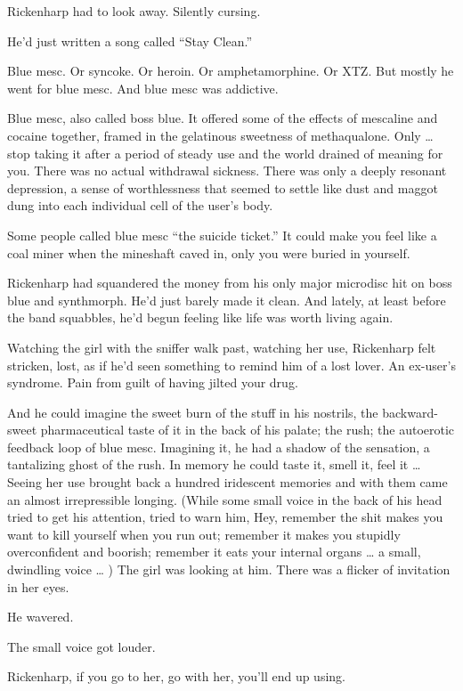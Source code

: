 Rickenharp had to look away. Silently cursing.

He’d just written a song called “Stay Clean.”

Blue mesc. Or syncoke. Or heroin. Or amphetamorphine. Or XTZ. But mostly he went for blue mesc. And blue mesc was addictive.

Blue mesc, also called boss blue. It offered some of the effects of mescaline and cocaine together, framed in the gelatinous sweetness of methaqualone. Only … stop taking it after a period of steady use and the world drained of meaning for you. There was no actual withdrawal sickness. There was only a deeply resonant depression, a sense of worthlessness that seemed to settle like dust and maggot dung into each individual cell of the user’s body.

Some people called blue mesc “the suicide ticket.” It could make you feel like a coal miner when the mineshaft caved in, only you were buried in yourself.

Rickenharp had squandered the money from his only major microdisc hit on boss blue and synthmorph. He’d just barely made it clean. And lately, at least before the band squabbles, he’d begun feeling like life was worth living again.

Watching the girl with the sniffer walk past, watching her use, Rickenharp felt stricken, lost, as if he’d seen something to remind him of a lost lover. An ex-user’s syndrome. Pain from guilt of having jilted your drug.

And he could imagine the sweet burn of the stuff in his nostrils, the backward-sweet pharmaceutical taste of it in the back of his palate; the rush; the autoerotic feedback loop of blue mesc. Imagining it, he had a shadow of the sensation, a tantalizing ghost of the rush. In memory he could taste it, smell it, feel it … Seeing her use brought back a hundred iridescent memories and with them came an almost irrepressible longing. (While some small voice in the back of his head tried to get his attention, tried to warn him, Hey, remember the shit makes you want to kill yourself when you run out; remember it makes you stupidly overconfident and boorish; remember it eats your internal organs … a small, dwindling voice … ) The girl was looking at him. There was a flicker of invitation in her eyes.

He wavered.

The small voice got louder.

Rickenharp, if you go to her, go with her, you’ll end up using.

